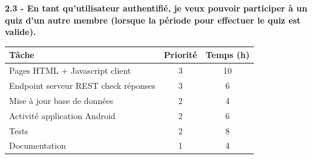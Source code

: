 \documentclass[a4paper, 12pt]{article}
\newenvironment{code}{\captionsetup{type=listing}}{}
\begin{document}
\bigbreak
\bigbreak
\textbf{2.3 - En tant qu'utilisateur authentifié, je veux pouvoir participer à un quiz d'un autre membre (lorsque la période pour effectuer le quiz est valide).}
\bigbreak
\begin{tabular}{|p{.6\linewidth}|c|c|} \hline
	\textbf{Tâche} & \textbf{Priorité} & \textbf{Temps (h)} \\ \hline
	Pages HTML + Javascript client & 3 & 10 \\ \hline
	Endpoint serveur REST check réponses & 3 & 6 \\ \hline
	Mise à jour base de données & 2 & 4 \\ \hline
	Activité application Android & 2 & 6 \\ \hline
    Tests & 2 & 8 \\ \hline
    Documentation & 1 & 4 \\ \hline
\end{tabular}



\end{document}
